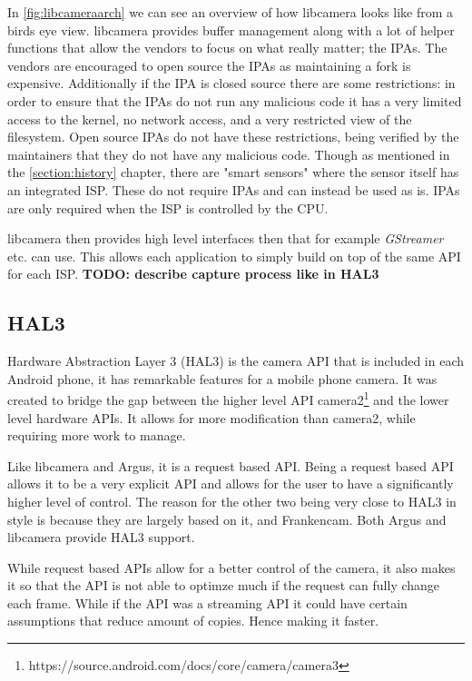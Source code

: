In \cref{fig:libcameraarch} we can see an overview of how libcamera looks like
from a birds eye view. libcamera provides buffer management along with a lot of
helper functions that allow the vendors to focus on what really matter; the
IPAs. The vendors are encouraged to open source the IPAs as maintaining a fork
is expensive. Additionally if the IPA is closed source there are some
restrictions: in order to ensure that the IPAs do not run any malicious code it
has a very limited access to the kernel, no network access, and a very
restricted view of the filesystem. Open source IPAs do not have these
restrictions, being verified by the maintainers that they do not have any
malicious code. Though as mentioned in the \cref{section:history} chapter,
there are "smart sensors" where the sensor itself has an integrated ISP. These
do not require IPAs and can instead be used as is. IPAs are only required when
the ISP is controlled by the CPU\cite{libcameraStack}.

libcamera then provides high level interfaces then that for example
\textit{GStreamer} etc. can use. This allows each application to simply build on top
of the same API for each ISP.
\textbf{TODO: describe capture process like in HAL3}

\subsection{HAL3}
Hardware Abstraction Layer 3 (HAL3) is the camera API that is included in each
Android phone, it has remarkable features for a mobile phone camera. It was
created to bridge the gap between the higher level API camera2\footnote{https://source.android.com/docs/core/camera/camera3}
and the lower level hardware APIs. It allows for more modification than
camera2, while requiring more work to manage.

Like libcamera and Argus, it is a request based API. Being a request based API
allows it to be a very explicit API and allows for the user to have a
significantly higher level of control. The reason for the other two being very
close to HAL3 in style is because they are largely based on it, and Frankencam.
Both Argus and libcamera provide HAL3 support.

While request based APIs allow for a better control of the camera, it also
makes it so that the API is not able to optimze much if the request can fully
change each frame. While if the API was a streaming API it could have certain
assumptions that reduce amount of copies. Hence making it faster.

